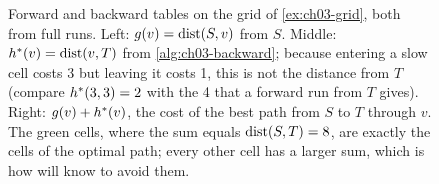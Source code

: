 \begin{figure}[tb]
  \centering
  \caption{Forward and backward tables on the grid of \cref{ex:ch03-grid}, both from full runs.
Left: $g(v)=\operatorname{dist}(S,v)$ from $S$. Middle: $h^*(v)=\operatorname{dist}(v,T)$ from
\cref{alg:ch03-backward}; because entering a slow cell costs 3 but leaving it costs 1, this is
not the distance from $T$ (compare $h^*(3,3)=2$ with the 4 that a forward run from $T$
gives). Right: $g(v)+h^*(v)$, the cost of the best path from $S$ to $T$ through $v$.
The green cells, where the sum equals $\operatorname{dist}(S,T)=8$, are exactly the cells of the optimal
path; every other cell has a larger sum, which is how \astar will know to avoid them.}
  \label{fig:ch03-backward-heuristic}
\end{figure}

